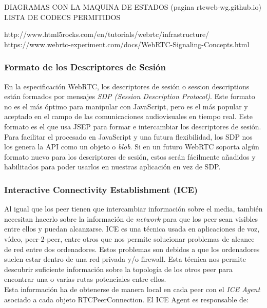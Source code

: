 DIAGRAMAS CON LA MAQUINA DE ESTADOS (pagina rtcweb-wg.github.io)
LISTA DE CODECS PERMITIDOS



http://www.html5rocks.com/en/tutorials/webrtc/infrastructure/
https://www.webrtc-experiment.com/docs/WebRTC-Signaling-Concepts.html

\subsubsection{Formato de los Descriptores de Sesión}

En la especificación WebRTC, los descriptores de sesión o session descriptions están formados por mensajes \textit{SDP (Session Description Protocol)}. Este formato no es el más óptimo para manipular con JavaScript, pero es el más popular y aceptado en el campo de las comunicaciones audiovisuales en tiempo real. Este formato es el que usa JSEP para formar e intercambiar los descriptores de sesión.\\

Para facilitar el procesado en JavaScript y una futura flexibilidad, los SDP nos los genera la API como un objeto o \textit{blob}. Si en un futuro WebRTC soporta algún formato nuevo para los descriptores de sesión, estos serán fácilmente añadidos y habilitados para poder usarlos en nuestras aplicación en vez de SDP.\\


\subsubsection{Interactive Connectivity Establishment (ICE)}

Al igual que los peer tienen que intercambiar información sobre el media, también necesitan hacerlo sobre la información de \textit{network} para que los peer sean visibles entre ellos y puedan alcanzarse. ICE es una técnica usada en aplicaciones de voz, vídeo, peer-2-peer, entre otros que nos permite solucionar problemas de alcance de red entre dos ordenadores. Estos problemas son debidos a que los ordenadores suelen estar dentro de una red privada y/o firewall. Esta técnica nos permite descubrir suficiente información sobre la topología de los otros peer para encontrar una o varias rutas potenciales entre ellos.\\

Esta información ha de obtenerse de manera local en cada peer con el \textit{ICE Agent} asociado a cada objeto RTCPeerConnection. El ICE Agent es responsable de: 

